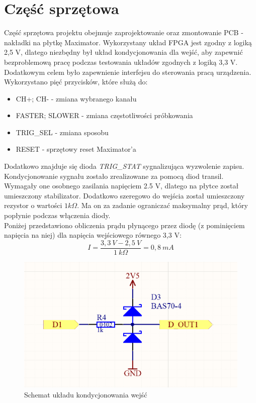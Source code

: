 \chapter{Część sprzętowa}

Część sprzętowa projektu obejmuje zaprojektowanie oraz zmontowanie PCB - nakładki na płytkę Maximator. Wykorzystany układ FPGA jest zgodny z logiką 2,5 V, dlatego niezbędny był układ kondycjonowania dla wejść, aby zapewnić bezproblemową pracę podczas testowania układów zgodnych z logiką 3,3 V. Dodatkowym celem było zapewnienie interfejsu do sterowania pracą urządzenia. \\
Wykorzystano pięć przycisków, które służą do:
\begin{itemize}
\item CH+; CH- - zmiana wybranego kanału
\item FASTER; SLOWER - zmiana częstotliwości próbkowania
\item TRIG\_SEL - zmiana sposobu 
\item RESET - sprzętowy reset Maximator'a
\end{itemize}
Dodatkowo znajduje się dioda \textit{TRIG\_STAT} sygnalizująca wyzwolenie zapisu. \\

Kondycjonowanie sygnału zostało zrealizowane za pomocą diod transil. Wymagały one osobnego zasilania napięciem 2.5 V, dlatego na płytce został umieszczony stabilizator. Dodatkowo szeregowo do wejścia został umieszczony rezystor o wartości $1 k\Omega$. Ma on za zadanie ograniczać maksymalny prąd, który popłynie podczas włączenia diody. \\
Poniżej przedstawiono obliczenia prądu płynącego przez diodę (z pominięciem napięcia na niej) dla napięcia wejściowego równego 3,3 V:
\begin{equation}
I = \frac{3,3\ V - 2,5\ V}{1\ k\Omega} = 0,8\ mA
\label{eq:diode_current}
\end{equation}

\begin{figure}[H]
\begin{center}
\includegraphics[width=3.5 in]{images/pin_conditioning.png}
\end{center}
\caption{Schemat układu kondycjonowania wejść}
\label{fig:pin_conditioning}
\end{figure}

